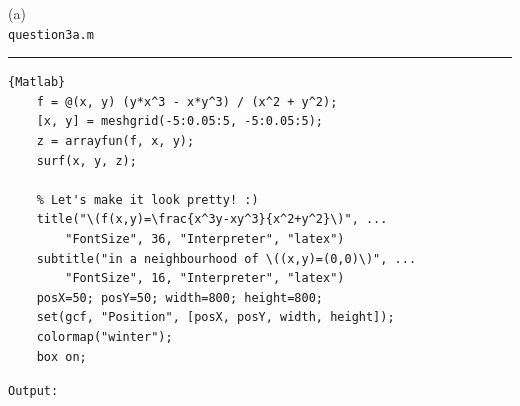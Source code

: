 \documentclass[a4paper, 11pt]{report}
\begin{document}
\pagebreak
{}
\sol (a)\\
\verb|question3a.m| \hrule
\begin{lstlisting}{Matlab}
	f = @(x, y) (y*x^3 - x*y^3) / (x^2 + y^2);
	[x, y] = meshgrid(-5:0.05:5, -5:0.05:5);
	z = arrayfun(f, x, y);
	surf(x, y, z);
	
	% Let's make it look pretty! :)
	title("\(f(x,y)=\frac{x^3y-xy^3}{x^2+y^2}\)", ...
		"FontSize", 36, "Interpreter", "latex")
	subtitle("in a neighbourhood of \((x,y)=(0,0)\)", ...
		"FontSize", 16, "Interpreter", "latex")
	posX=50; posY=50; width=800; height=800;
	set(gcf, "Position", [posX, posY, width, height]);
	colormap("winter");
	box on;
\end{lstlisting}
\verb|Output:|
\begin{center}
\end{center}
\end{document}
